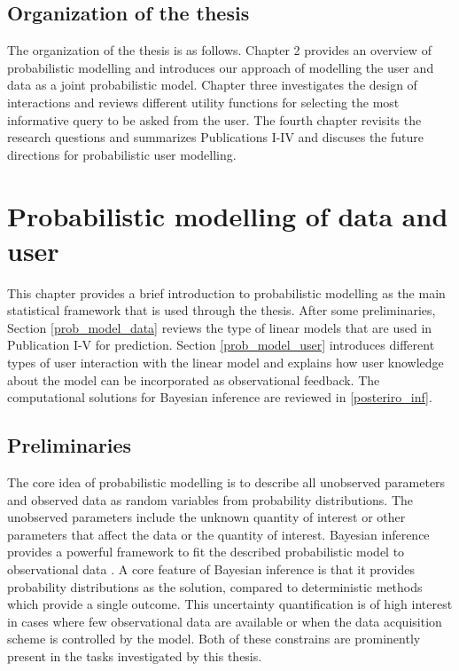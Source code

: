 \documentclass[dissertation,math,vertlayout,pdfa,colorlinks]{aaltoseries}
\begin{document}
\section{Organization of the thesis}

The organization of the thesis is as follows. Chapter 2 provides an overview of probabilistic modelling and introduces our approach of modelling the user and data as a joint probabilistic model. Chapter three investigates the design of interactions and reviews different utility functions for selecting the most informative query to be asked from the user. The fourth chapter revisits the research questions and summarizes Publications I-IV and discuses the future directions for probabilistic user modelling.



\chapter{Probabilistic modelling of data and user} \label{prob_model_data_user}


This chapter provides a brief introduction to probabilistic modelling as the main statistical framework that is used through the thesis. After some preliminaries,  Section \ref{prob_model_data} reviews the type of linear models that are used in Publication I-V for prediction. Section \ref{prob_model_user} introduces different types of user interaction with the linear model and explains how user knowledge about the model can be incorporated as observational feedback. The computational solutions for Bayesian inference are reviewed in \ref{posteriro_inf}. %

\section{Preliminaries}
The core idea of probabilistic modelling is to describe all unobserved parameters and observed data as random variables from probability distributions. The unobserved parameters include the unknown quantity of interest or other parameters that affect the data or the quantity of interest. Bayesian inference provides a powerful framework to fit the described probabilistic model to observational data \cite{Gelman2013}. A core feature of Bayesian inference is that it provides probability distributions as the solution, compared to deterministic methods which provide a single outcome. This uncertainty quantification is of high interest in cases where few observational data are available or when the data acquisition scheme is controlled by the model. Both of these constrains are prominently present in the tasks investigated by this thesis.
\end{document}
